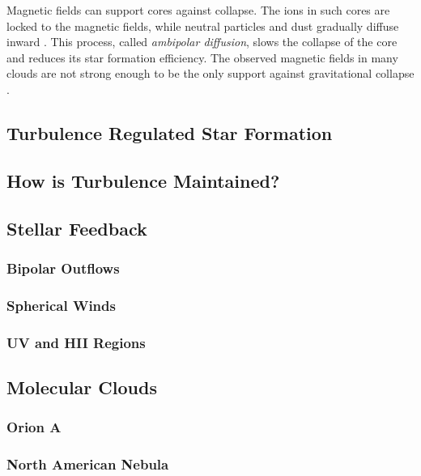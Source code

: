 Magnetic fields can support cores against collapse. The ions in such cores are locked to the magnetic fields, while neutral particles and dust gradually diffuse inward \cite{Mestel_1956}. This process, called \textit{ambipolar diffusion}, slows the collapse of the core and reduces its star formation efficiency. The observed magnetic fields in many clouds are not strong enough to be the only support against gravitational collapse \cite{Crutcher_2012}.



\subsection{Turbulence Regulated Star Formation}\label{sec:turb}

\subsection{How is Turbulence Maintained?}\label{sec:turb-maint}

\subsection{Stellar Feedback}\label{sec:feedback}

\subsubsection{Bipolar Outflows}\label{sec:outflow}

\subsubsection{Spherical Winds}\label{sec:wind}

\subsubsection{UV and HII Regions}\label{sec:uv}

\subsection{Molecular Clouds}\label{sec:clouds}

\subsubsection{Orion A}\label{sec:orion}

\subsubsection{North American Nebula}\label{sec:nan}
  
  
  
  
  